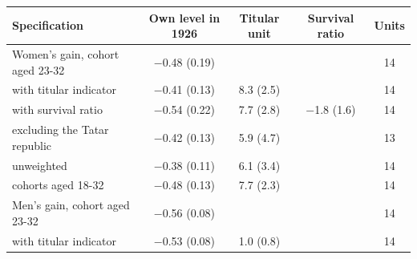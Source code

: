 \begin{tabular}{lcccc}
\toprule
Specification & Own level in 1926 & Titular unit & Survival ratio & Units \\
\midrule
Women's gain, cohort aged 23-32 & $-$0.48 (0.19) &  &  & 14 \\
\quad with titular indicator & $-$0.41 (0.13) & 8.3 (2.5) &  & 14 \\
\quad with survival ratio & $-$0.54 (0.22) & 7.7 (2.8) & $-$1.8 (1.6) & 14 \\
\quad excluding the Tatar republic & $-$0.42 (0.13) & 5.9 (4.7) &  & 13 \\
\quad unweighted & $-$0.38 (0.11) & 6.1 (3.4) &  & 14 \\
\quad cohorts aged 18-32 & $-$0.48 (0.13) & 7.7 (2.3) &  & 14 \\
Men's gain, cohort aged 23-32 & $-$0.56 (0.08) &  &  & 14 \\
\quad with titular indicator & $-$0.53 (0.08) & 1.0 (0.8) &  & 14 \\
\bottomrule
\end{tabular}
